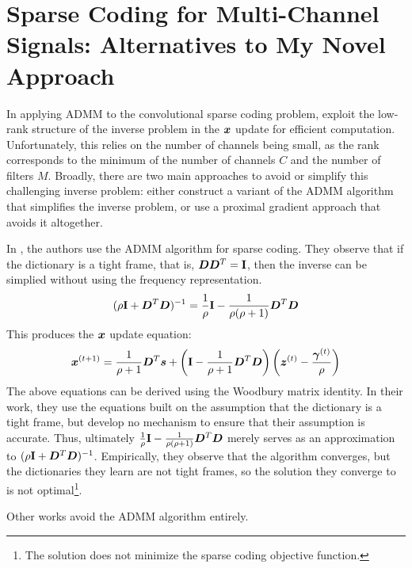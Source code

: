 \section{Sparse Coding for Multi-Channel Signals: Alternatives to My Novel Approach}
In applying ADMM to the convolutional sparse coding problem, \cite{vsorel2016fast} \cite{heide2015fast} \cite{wohlberg2015efficient} exploit the low-rank structure of the inverse problem in the $\bm{x}$ update for efficient computation. Unfortunately, this relies on the number of channels being small, as the rank corresponds to the minimum of the number of channels $C$ and the number of filters $M$. Broadly, there are two main approaches to avoid or simplify this challenging inverse problem: either construct a variant of the ADMM algorithm that simplifies the inverse problem, or use a proximal gradient approach that avoids it altogether.

In \cite{chodosh2018deep}\cite{murdock2018deep}, the authors use the ADMM algorithm for sparse coding. They observe that if the dictionary is a tight frame, that is, $\bm{D}\bm{D}^T = {\bf I}$, then the inverse can be simplied without using the frequency representation.
%
\begin{equation}
(\rho{\bf I} + \bm{D}^T\bm{D})^{-1} = \frac{1}{\rho}{\bf I} - \frac{1}{\rho(\rho + 1)}\bm{D}^T\bm{D}
\end{equation}
%
This produces the $\bm{x}$ update equation:
%
\begin{equation}
\bm{x}^{(t + 1)} = \frac{1}{\rho + 1}\bm{D}^T\bm{s} + \left({\bf I} - \frac{1}{\rho + 1}\bm{D}^T\bm{D}\right)\left(\bm{z}^{(t)} - \frac{\bm{\gamma}^{(t)}}{\rho}\right)
\end{equation}
%
The above equations can be derived using the Woodbury matrix identity. In their work, they use the equations built on the assumption that the dictionary is a tight frame, but develop no mechanism to ensure that their assumption is accurate. Thus, ultimately $\frac{1}{\rho}{\bf I} - \frac{1}{\rho(\rho + 1)}\bm{D}^T\bm{D}$ merely serves as an approximation to $(\rho{\bf I} + \bm{D}^T\bm{D})^{-1}$. Empirically, they observe that the algorithm converges, but the dictionaries they learn are not tight frames, so the solution they converge to is not optimal\footnote{The solution does not minimize the sparse coding objective function.}.

Other works avoid the ADMM algorithm entirely.

